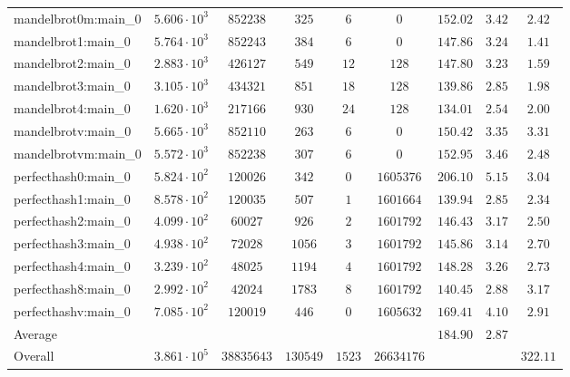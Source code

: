 \begin{tabular}{|l|c|c|c|c|c|c|c|c|}
mandelbrot0m:main\_0           & $ 5.606 \cdot 10^{3} $ & $ 852238   $ & $ 325    $ & $ 6    $ & $ 0        $ & $ 152.02      $ & $ 3.42    $ & $ 2.42    $ \\
mandelbrot1:main\_0            & $ 5.764 \cdot 10^{3} $ & $ 852243   $ & $ 384    $ & $ 6    $ & $ 0        $ & $ 147.86      $ & $ 3.24    $ & $ 1.41    $ \\
mandelbrot2:main\_0            & $ 2.883 \cdot 10^{3} $ & $ 426127   $ & $ 549    $ & $ 12   $ & $ 128      $ & $ 147.80      $ & $ 3.23    $ & $ 1.59    $ \\
mandelbrot3:main\_0            & $ 3.105 \cdot 10^{3} $ & $ 434321   $ & $ 851    $ & $ 18   $ & $ 128      $ & $ 139.86      $ & $ 2.85    $ & $ 1.98    $ \\
mandelbrot4:main\_0            & $ 1.620 \cdot 10^{3} $ & $ 217166   $ & $ 930    $ & $ 24   $ & $ 128      $ & $ 134.01      $ & $ 2.54    $ & $ 2.00    $ \\
mandelbrotv:main\_0            & $ 5.665 \cdot 10^{3} $ & $ 852110   $ & $ 263    $ & $ 6    $ & $ 0        $ & $ 150.42      $ & $ 3.35    $ & $ 3.31    $ \\
mandelbrotvm:main\_0           & $ 5.572 \cdot 10^{3} $ & $ 852238   $ & $ 307    $ & $ 6    $ & $ 0        $ & $ 152.95      $ & $ 3.46    $ & $ 2.48    $ \\
perfecthash0:main\_0           & $ 5.824 \cdot 10^{2} $ & $ 120026   $ & $ 342    $ & $ 0    $ & $ 1605376  $ & $ 206.10      $ & $ 5.15    $ & $ 3.04    $ \\
perfecthash1:main\_0           & $ 8.578 \cdot 10^{2} $ & $ 120035   $ & $ 507    $ & $ 1    $ & $ 1601664  $ & $ 139.94      $ & $ 2.85    $ & $ 2.34    $ \\
perfecthash2:main\_0           & $ 4.099 \cdot 10^{2} $ & $ 60027    $ & $ 926    $ & $ 2    $ & $ 1601792  $ & $ 146.43      $ & $ 3.17    $ & $ 2.50    $ \\
perfecthash3:main\_0           & $ 4.938 \cdot 10^{2} $ & $ 72028    $ & $ 1056   $ & $ 3    $ & $ 1601792  $ & $ 145.86      $ & $ 3.14    $ & $ 2.70    $ \\
perfecthash4:main\_0           & $ 3.239 \cdot 10^{2} $ & $ 48025    $ & $ 1194   $ & $ 4    $ & $ 1601792  $ & $ 148.28      $ & $ 3.26    $ & $ 2.73    $ \\
perfecthash8:main\_0           & $ 2.992 \cdot 10^{2} $ & $ 42024    $ & $ 1783   $ & $ 8    $ & $ 1601792  $ & $ 140.45      $ & $ 2.88    $ & $ 3.17    $ \\
perfecthashv:main\_0           & $ 7.085 \cdot 10^{2} $ & $ 120019   $ & $ 446    $ & $ 0    $ & $ 1605632  $ & $ 169.41      $ & $ 4.10    $ & $ 2.91    $ \\
\hline
Average                        & $                    $ & $          $ & $        $ & $      $ & $          $ & $ 184.90      $ & $ 2.87    $ & $         $ \\
\hline
Overall                        & $ 3.861 \cdot 10^{5} $ & $ 38835643 $ & $ 130549 $ & $ 1523 $ & $ 26634176 $ & $             $ & $         $ & $ 322.11  $ \\
\hline
\end{tabular}
